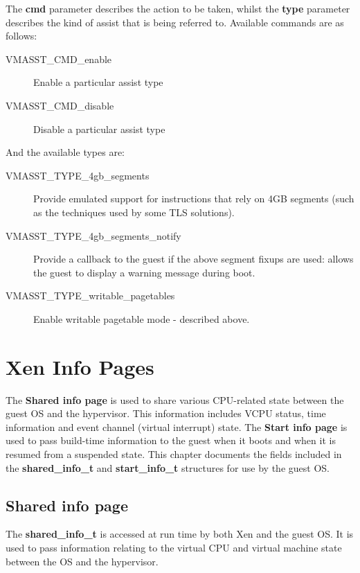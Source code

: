 \documentclass[11pt,twoside,final,openright,a4paper]{report}
\newcommand{\hypercall}[1]{\vspace{2mm}{\sf #1}}
\begin{document}
\hypercall{vm\_assist(unsigned int cmd, unsigned int type)}

The {\bf cmd} parameter describes the action to be taken, whilst the
{\bf type} parameter describes the kind of assist that is being
referred to.  Available commands are as follows:

\begin{description}
\item[VMASST\_CMD\_enable] Enable a particular assist type
\item[VMASST\_CMD\_disable] Disable a particular assist type
\end{description}

And the available types are:

\begin{description}
\item[VMASST\_TYPE\_4gb\_segments] Provide emulated support for
  instructions that rely on 4GB segments (such as the techniques used
  by some TLS solutions).
\item[VMASST\_TYPE\_4gb\_segments\_notify] Provide a callback to the
  guest if the above segment fixups are used: allows the guest to
  display a warning message during boot.
\item[VMASST\_TYPE\_writable\_pagetables] Enable writable pagetable
  mode - described above.
\end{description}


\chapter{Xen Info Pages}

The {\bf Shared info page} is used to share various CPU-related state
between the guest OS and the hypervisor.  This information includes VCPU
status, time information and event channel (virtual interrupt) state.
The {\bf Start info page} is used to pass build-time information to
the guest when it boots and when it is resumed from a suspended state.
This chapter documents the fields included in the {\bf
shared\_info\_t} and {\bf start\_info\_t} structures for use by the
guest OS.

\section{Shared info page}

The {\bf shared\_info\_t} is accessed at run time by both Xen and the
guest OS.  It is used to pass information relating to the
virtual CPU and virtual machine state between the OS and the
hypervisor.
\end{document}
